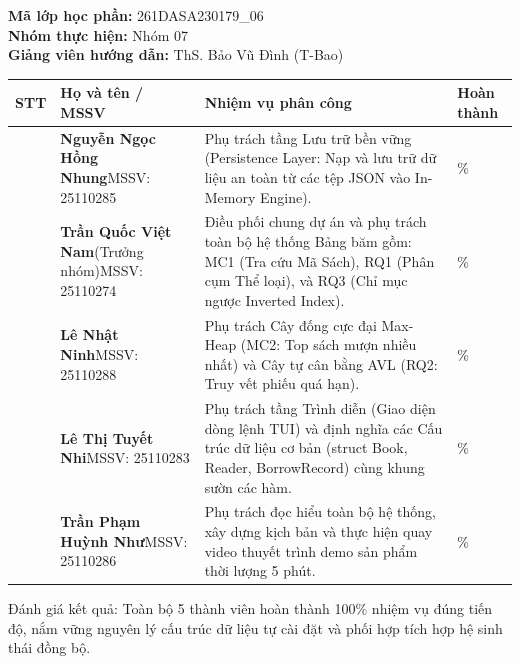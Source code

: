 \documentclass[14pt,a4paper]{extarticle}
\begin{document}
\vspace{-0.25cm}
\noindent
\textbf{Mã lớp học phần:} 261DASA230179\_06\\[0.1cm]
\textbf{Nhóm thực hiện:} Nhóm 07\\[0.1cm]
\textbf{Giảng viên hướng dẫn:} ThS. Bảo Vũ Đình (T-Bao)\\[0.25cm]
\noindent
\begingroup
{}
\setlength{\tabcolsep}{3pt}
\renewcommand{\arraystretch}{1.0}
\begin{tabularx}{\linewidth}{|>{\centering\arraybackslash}m{1.2cm}|>{\raggedright\arraybackslash}m{3.5cm}|>{\raggedright\arraybackslash}X|>{\centering\arraybackslash}m{2.2cm}|}
\hline
\textbf{STT} & \textbf{Họ và tên / MSSV} & \textbf{Nhiệm vụ phân công} & \textbf{Hoàn thành} \\ \hline
1 & \textbf{Nguyễn Ngọc Hồng Nhung}\newline MSSV: 25110285 & Phụ trách tầng Lưu trữ bền vững (Persistence Layer: Nạp và lưu trữ dữ liệu an toàn từ các tệp JSON vào In-Memory Engine). & 100\% \\ \hline
2 & \textbf{Trần Quốc Việt Nam}\newline (Trưởng nhóm)\newline MSSV: 25110274 & Điều phối chung dự án và phụ trách toàn bộ hệ thống Bảng băm gồm: MC1 (Tra cứu Mã Sách), RQ1 (Phân cụm Thể loại), và RQ3 (Chỉ mục ngược Inverted Index). & 100\% \\ \hline
3 & \textbf{Lê Nhật Ninh}\newline MSSV: 25110288 & Phụ trách Cây đống cực đại Max-Heap (MC2: Top sách mượn nhiều nhất) và Cây tự cân bằng AVL (RQ2: Truy vết phiếu quá hạn). & 100\% \\ \hline
4 & \textbf{Lê Thị Tuyết Nhi}\newline MSSV: 25110283 & Phụ trách tầng Trình diễn (Giao diện dòng lệnh TUI) và định nghĩa các Cấu trúc dữ liệu cơ bản (struct Book, Reader, BorrowRecord) cùng khung sườn các hàm. & 100\% \\ \hline
5 & \textbf{Trần Phạm Huỳnh Như}\newline MSSV: 25110286 & Phụ trách đọc hiểu toàn bộ hệ thống, xây dựng kịch bản và thực hiện quay video thuyết trình demo sản phẩm thời lượng 5 phút. & 100\% \\ \hline
\end{tabularx}
\endgroup

\vspace{0.25cm}
\noindent
Đánh giá kết quả: Toàn bộ 5 thành viên hoàn thành 100\% nhiệm vụ đúng tiến độ, nắm vững nguyên lý cấu trúc dữ liệu tự cài đặt và phối hợp tích hợp hệ sinh thái đồng bộ.
\endgroup
\end{document}

